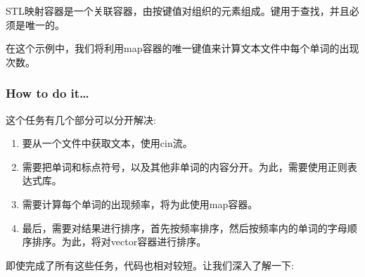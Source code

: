 
STL映射容器是一个关联容器，由按键值对组织的元素组成。键用于查找，并且必须是唯一的。

在这个示例中，我们将利用map容器的唯一键值来计算文本文件中每个单词的出现次数。

\subsubsection{How to do it…}

这个任务有几个部分可以分开解决:

\begin{enumerate}
\item 
要从一个文件中获取文本，使用cin流。

\item 
需要把单词和标点符号，以及其他非单词的内容分开。为此，需要使用正则表达式库。

\item 
需要计算每个单词的出现频率，将为此使用map容器。

\item 
最后，需要对结果进行排序，首先按频率排序，然后按频率内的单词的字母顺序排序。为此，将对vector容器进行排序。
\end{enumerate}

即使完成了所有这些任务，代码也相对较短。让我们深入了解一下:

